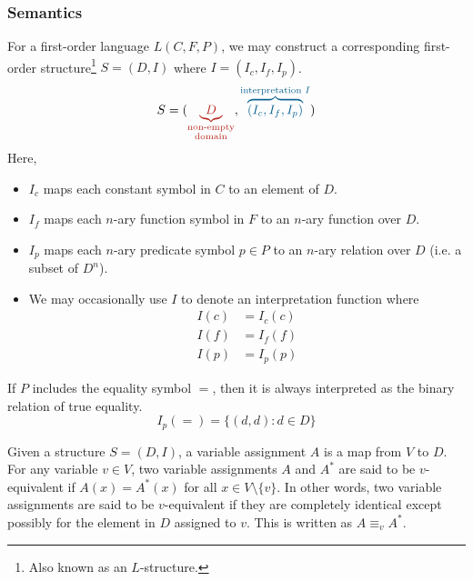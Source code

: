 \subsubsection{Semantics}

For a first-order language \(L(C, F, P)\), we may construct a corresponding first-order structure\footnote{Also known as an \(L\)-structure.} \(S = (D, I)\) where \(I = (I_c, I_f, I_p)\).
%
{\large
    \[
        S = (
            {\color{BrickRed}
                \underbrace{D}_{\substack{
                    \text{non-empty}\\
                    \text{domain}
                }}
            }
            ,
            {\color{MidnightBlue}
                \overbrace{(
                    I_c,
                    I_f,
                    I_p
                )}^{\text{interpretation } I}
            }
        )
    \]
}
%
Here,
\begin{itemize}
    \item \(I_c\) maps each constant symbol in \(C\) to an element of \(D\).
    \item \(I_f\) maps each \(n\)-ary function symbol in \(F\) to an \(n\)-ary function over \(D\).
    \item \(I_p\) maps each \(n\)-ary predicate symbol \(p \in P\) to an \(n\)-ary relation over \(D\) (i.e. a subset of \(D^n\)).
    \item We may occasionally use \(I\) to denote an interpretation function where
    \begin{align*}
        I(c) &= I_c (c) \tag{for all \(c \in C\)}\\
        I(f) &= I_f (f) \tag{for all \(f \in F\)}\\
        I(p) &= I_p (p) \tag{for all \(p \in P\)}
    \end{align*}
\end{itemize}

If \(P\) includes the equality symbol \(=\), then it is always interpreted as the binary relation of true equality.
%
\[I_p (=) = \{(d, d) : d \in D\}\]

Given a structure \(S = (D, I)\), a variable assignment \(A\) is a map from \(V\) to \(D\). For any variable \(v \in V\), two variable assignments \(A\) and \(A^{*}\) are said to be \(v\)-equivalent if \(A(x) = A^{*}(x)\) for all \(x \in V \setminus \{v\}\). In other words, two variable assignments are said to be \(v\)-equivalent if they are completely identical except possibly for the element in \(D\) assigned to \(v\). This is written as \(A \equiv_v A^{*}\).

